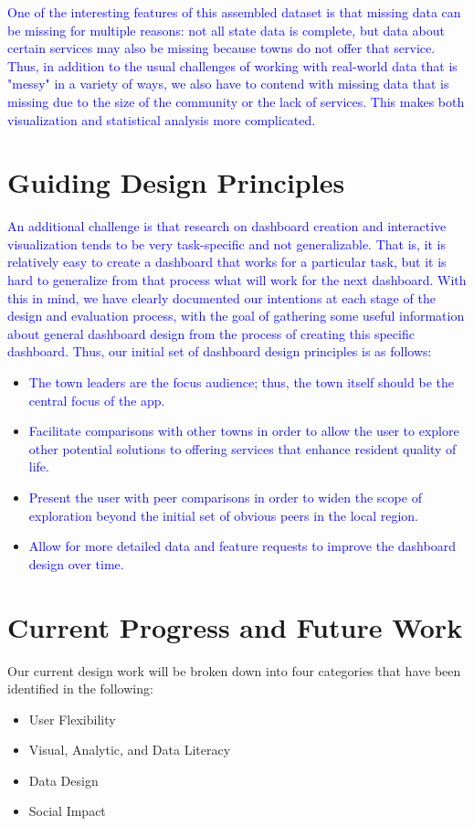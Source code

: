 \documentclass[10pt]{article}\usepackage[]{graphicx}\usepackage[]{color}
\newcommand{\svp}[1]{{\textcolor{blue}{#1}}}
\begin{document}
\svp{One of the interesting features of this assembled dataset is that missing data can be missing for multiple reasons: not all state data is complete, but data about certain services may also be missing because towns do not offer that service.}
\svp{Thus, in addition to the usual challenges of working with real-world data that is "messy" in a variety of ways, we also have to contend with missing data that is missing due to the size of the community or the lack of services. This makes both visualization and statistical analysis more complicated.}

\section{Guiding Design Principles}
\svp{An additional challenge is that research on dashboard creation and interactive visualization tends to be very task-specific and not generalizable. That is, it is relatively easy to create a dashboard that works for a particular task, but it is hard to generalize from that process what will work for the next dashboard. With this in mind, we have clearly documented our intentions at each stage of the design and evaluation process, with the goal of gathering some useful information about general dashboard design from the process of creating this specific dashboard.}
\svp{Thus, our initial set of dashboard design principles is as follows: }
\begin{itemize}
\item \svp{The town leaders are the focus audience; thus, the town itself should be the central focus of the app.}
\item \svp{Facilitate comparisons with other towns in order to allow the user to explore other potential solutions to offering services that enhance resident quality of life.}
\item \svp{Present the user with peer comparisons in order to widen the scope of exploration beyond the initial set of obvious peers in the local region.}
\item \svp{Allow for more detailed data and feature requests to improve the dashboard design over time.}
\end{itemize}


\section{Current Progress and Future Work}
Our current design work will be broken down into four categories that have been identified in the following:
\begin{itemize}
\item User Flexibility 
\item Visual, Analytic, and Data Literacy
\item Data Design
\item Social Impact
\end{itemize}
\end{document}
